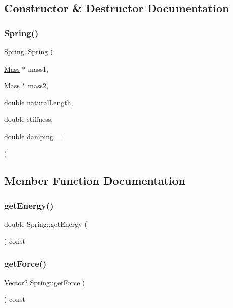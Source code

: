 \subsection{Constructor \& Destructor Documentation}
\mbox{\label{classSpring_aa200d0ef9f53cf415c564e711079a5d9}} 
\subsubsection{\texorpdfstring{Spring()}{Spring()}}
{\footnotesize\ttfamily Spring\+::\+Spring (\begin{DoxyParamCaption}\item[{\hyperlink{classMass}{Mass} $\ast$}]{mass1,  }\item[{\hyperlink{classMass}{Mass} $\ast$}]{mass2,  }\item[{double}]{natural\+Length,  }\item[{double}]{stiffness,  }\item[{double}]{damping = {} }\end{DoxyParamCaption})}



\subsection{Member Function Documentation}
\mbox{\label{classSpring_a58ef4f35d8a552adb76662b4d7615741}} 
\subsubsection{\texorpdfstring{get\+Energy()}{getEnergy()}}
{\footnotesize\ttfamily double Spring\+::get\+Energy (\begin{DoxyParamCaption}{ }\end{DoxyParamCaption}) const}

\mbox{\label{classSpring_a9b4eb2edf28f7d03f5acc7f8d276207f}} 
\subsubsection{\texorpdfstring{get\+Force()}{getForce()}}
{\footnotesize\ttfamily \hyperlink{classVector2}{Vector2} Spring\+::get\+Force (\begin{DoxyParamCaption}{ }\end{DoxyParamCaption}) const}

